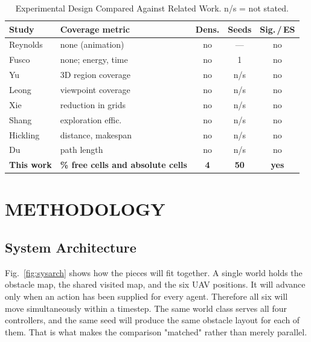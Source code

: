 \documentclass[a4paper, 10pt, conference]{ieeeconf}
\begin{document}
\begin{table}[htb]
\centering
\caption{Experimental Design Compared Against Related Work.
n/s = not stated.}
\label{tab:related}
\scriptsize
\setlength{\tabcolsep}{3pt}
\begin{tabular}{llccc}
\toprule
\textbf{Study} & \textbf{Coverage metric} & \textbf{Dens.} &
\textbf{Seeds} & \textbf{Sig.\,/\,ES} \\
\midrule
Reynolds~\cite{reynolds1987} & none (animation) & no & --- & no \\
Fusco~\cite{fusco2025}       & none; energy, time & no & 1 & no \\
Yu~\cite{yu2025}             & 3D region coverage & no & n/s & no \\
Leong~\cite{leong2024}       & viewpoint coverage & no & n/s & no \\
Xie~\cite{xie2025}           & reduction in grids & no & n/s & no \\
Shang~\cite{shang2025}       & exploration effic. & no & n/s & no \\
Hickling~\cite{hickling2025} & distance, makespan & no & n/s & no \\
Du~\cite{du2023}             & path length & no & n/s & no \\
\midrule
\textbf{This work} & \textbf{\% free cells and absolute cells} &
\textbf{4} & \textbf{50} & \textbf{yes} \\
\bottomrule
\end{tabular}
\end{table}

\section{METHODOLOGY}\label{sec:methodology}

\subsection{System Architecture}\label{sec:arch}

Fig.~\ref{fig:sysarch} shows how the pieces will fit together. A
single world holds the obstacle map, the shared visited map, and the
six UAV positions. It will advance only when an action has been
supplied for every agent. Therefore all six will move simultaneously
within a timestep. The same world class serves all four controllers,
and the same seed will produce the same obstacle layout for each of
them. That is what makes the comparison "matched" rather than merely
parallel.
\end{document}
